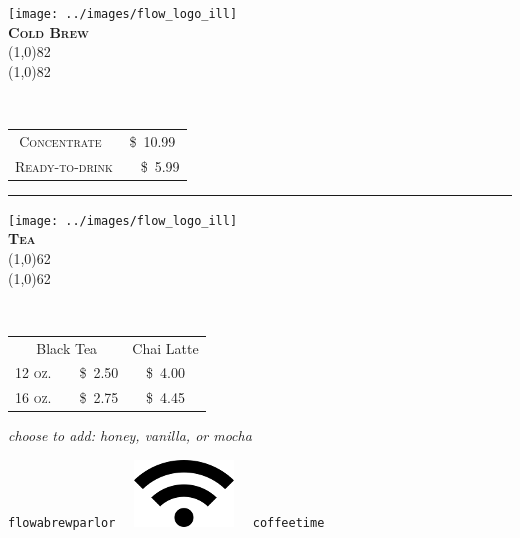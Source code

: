 \documentclass[letterpaper, 12pt]{article}%
\newcommand{\ill}{
\texttt{[image: ../images/flow\_logo\_ill]}
}
\newcommand{\menuentry}[2]{
 \emph{\footnotesize#1}\\
 \vspace*{\fill}
 {\small#2}
}
\newcommand{\menuitem}[4]{
 \centering
  \ill\\
  \smallskip\vspace{0.1em}
  \textbf{\sffamily \textsc{\large#2}}\vspace{-1ex}\\
  \line(1,0){#1}\vspace{-2ex}\\
  \line(1,0){#1}\vspace{0.5ex}\\
  \smallskip
  \menuentry{#3}{#4}
}
\newcommand{\flowtherefore}{~~\raisebox{0.2ex}{$\therefore$}~~}
\newcommand{\price}[2]{
 \textsc{\small#1}\flowtherefore\$~\textsc{\small#2}
}
\newcommand{\varprice}[1]{
 \$~\textsc{\small#1}
}
\begin{document}
\newlength{\coffeerowtwo}
\setlength{\coffeerowtwo}{0.18\textwidth}
{\centering
   
    
 \begin{minipage}[t][\coffeerowtwo][b]{0.3\textwidth}
  \centering
  \menuitem{82}{
   Cold Brew}{\vspace{-1ex}
   }{
   \begin{tabular}{@{} c @{}}
   \price{Concentrate}{10.99}\\
   \price{Ready-to-drink}{5.99}\\
   \end{tabular}
   
   \rule{0pt}{2.2em}
    
  }
 \end{minipage} 
 \rule{3em}{0pt}
 \begin{minipage}[t][\coffeerowtwo][b]{0.3\textwidth}
  \centering
  \menuitem{62}{
   Tea}{
   }{
   \begin{tabular}{@{} c c @{}}
   Black Tea & Chai Latte\\
   \price{12 oz.}{2.50} & \varprice{4.00}\\
   \price{16 oz.}{2.75} & \varprice{4.45}\\
   \end{tabular}
   
   \rule{0pt}{1.2em}
    
  }
 \end{minipage} 
 
 \emph{choose to add: honey, vanilla, or mocha}
 
}



{\centering
 \texttt{\large flowabrewparlor}
 ~~\includegraphics{wifi}~~
 \texttt{\large coffeetime}
 \vspace{0.5em}
 
} 
\end{document}
